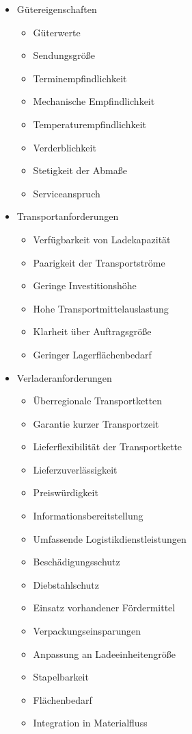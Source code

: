 \begin{itemize}
%
   \item Gütereigenschaften
\begin{itemize}
% 
   \item Güterwerte
   \item Sendungsgröße
   \item Terminempfindlichkeit
   \item Mechanische Empfindlichkeit
   \item Temperaturempfindlichkeit
   \item Verderblichkeit
   \item Stetigkeit der Abmaße
   \item Serviceanspruch
%
\end{itemize}
 
   \item Transportanforderungen
\begin{itemize}
% 
   \item Verfügbarkeit von Ladekapazität
   \item Paarigkeit der Transportströme
   \item Geringe Investitionshöhe
   \item Hohe Transportmittelauslastung
   \item Klarheit über Auftragsgröße
   \item Geringer Lagerflächenbedarf
%
\end{itemize}
 
   \item Verladeranforderungen
\begin{itemize}
% 
   \item Überregionale Transportketten
   \item Garantie kurzer Transportzeit
   \item Lieferflexibilität der Transportkette
   \item Lieferzuverlässigkeit
   \item Preiswürdigkeit
   \item Informationsbereitstellung
   \item Umfassende Logistikdienstleistungen
   \item Beschädigungsschutz
   \item Diebstahlschutz
   \item Einsatz vorhandener Fördermittel
   \item Verpackungseinsparungen
   \item Anpassung an Ladeeinheitengröße
   \item Stapelbarkeit
   \item Flächenbedarf
   \item Integration in Materialfluss
%
\end{itemize}

%
\end{itemize}

